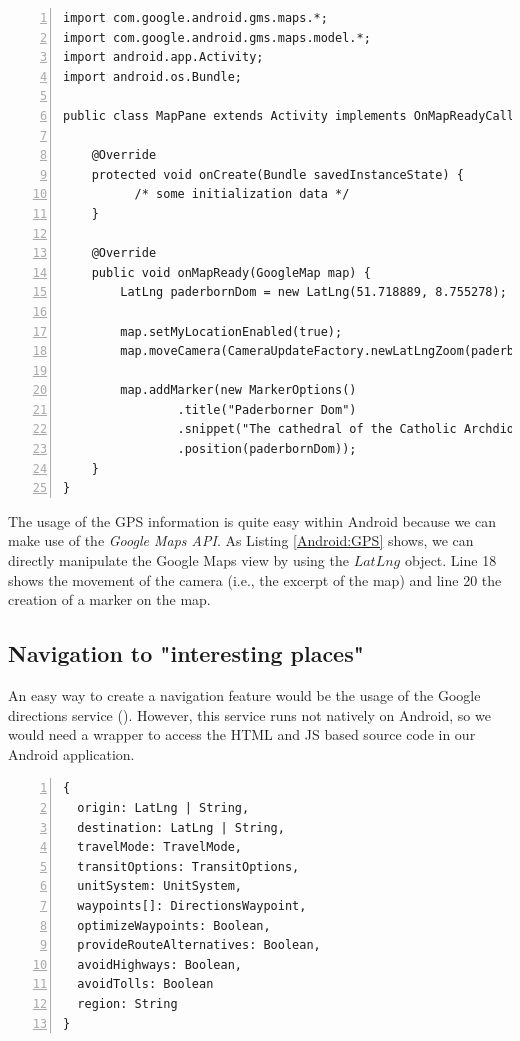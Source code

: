 \begin{lstlisting}[numbers=left,caption={Example for using the GPS coordinates within an Android application},label=Android:GPS,frame=tlbr,breaklines]
import com.google.android.gms.maps.*;
import com.google.android.gms.maps.model.*;
import android.app.Activity;
import android.os.Bundle;

public class MapPane extends Activity implements OnMapReadyCallback {

    @Override
    protected void onCreate(Bundle savedInstanceState) {
	      /* some initialization data */
    }

    @Override
    public void onMapReady(GoogleMap map) {
        LatLng paderbornDom = new LatLng(51.718889, 8.755278);

        map.setMyLocationEnabled(true);
        map.moveCamera(CameraUpdateFactory.newLatLngZoom(paderbornDom, 13));

        map.addMarker(new MarkerOptions()
                .title("Paderborner Dom")
                .snippet("The cathedral of the Catholic Archdiocese of Paderborn")
                .position(paderbornDom));
    }
}
\end{lstlisting}

The usage of the \ac{GPS} information is quite easy within Android because we can make use of the \emph{Google Maps API}. As Listing \ref{Android:GPS} shows, we can directly manipulate the Google Maps view by using the $LatLng$ object. Line 18 shows the movement of the camera (i.e., the excerpt of the map) and line 20 the creation of a marker on the map. 

\subsection{Navigation to "interesting places"}
An easy way to create a navigation feature would be the usage of the Google directions service (\cite{GoogleNavi}). However, this service runs not natively on Android, so we would need a wrapper to access the \ac{HTML} and \ac{JS} based source code in our Android application. 

\begin{lstlisting}[numbers=left,caption={Example for construction of the DirectionsRequest JSON object that is needed to use the directions service},label=Android:dirService,frame=tlbr,breaklines]
{
  origin: LatLng | String,
  destination: LatLng | String,
  travelMode: TravelMode,
  transitOptions: TransitOptions,
  unitSystem: UnitSystem,
  waypoints[]: DirectionsWaypoint,
  optimizeWaypoints: Boolean,
  provideRouteAlternatives: Boolean,
  avoidHighways: Boolean,
  avoidTolls: Boolean
  region: String
}
\end{lstlisting}

